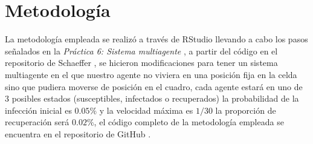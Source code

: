 \documentclass[a4paper]{article}
\begin{document}
\section{Metodología}
\justify
La metodología empleada se realizó a través de RStudio \cite{RStudio} llevando a cabo los pasos señalados en la \textit{Práctica 6: Sistema multiagente} \cite{p5}, a partir del código en el repositorio de Schaeffer \cite{p3gitdr}, se hicieron modificaciones para tener un sistema multiagente en el que nuestro agente no viviera en una posición fija en la celda sino que pudiera moverse de posición en el cuadro, cada agente estará en uno de 3 posibles estados (susceptibles, infectados o recuperados) la probabilidad de la infección inicial es $0.05 \%$ y la velocidad máxima es $1/30$  la proporción de recuperación será $0.02 \%$, el código completo de la metodología empleada se encuentra en el repositorio de GitHub \cite{gitadrian}.
\end{document}
